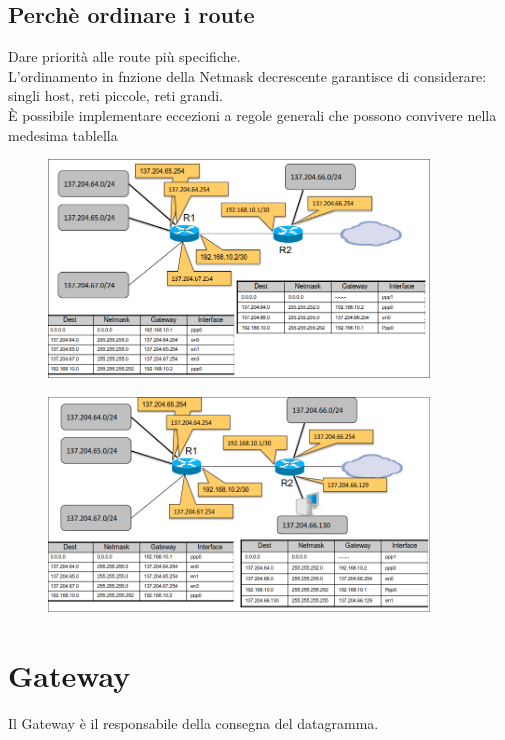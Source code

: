 \documentclass{report}
\begin{document}
            \subsection{Perchè ordinare i route}
                Dare priorità alle route più specifiche.
                \\
                L'ordinamento in fnzione della Netmask decrescente garantisce di considerare: singli host, reti piccole, reti grandi.
                \\
                È possibile implementare eccezioni a regole generali che possono convivere nella medesima tablella
                \begin{figure}[H]
                    \includegraphics[width=0.9\textwidth]{1/pr.png}
                \end{figure}
                 \begin{figure}[H]
                    \includegraphics[width=0.9\textwidth]{1/pr2.png}
                \end{figure}
        \section{Gateway}
            Il Gateway è il responsabile della consegna del datagramma.
\end{document}

